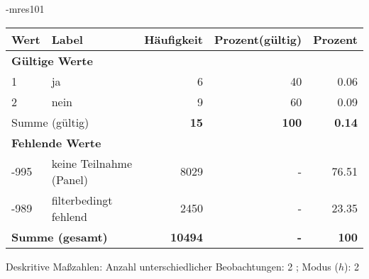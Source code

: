                 \vspace*{-\baselineskip}
					\begin{filecontents}{\jobname-mres101}
					\begin{longtable}{lXrrr}
					\toprule
					\textbf{Wert} & \textbf{Label} & \textbf{Häufigkeit} & \textbf{Prozent(gültig)} & \textbf{Prozent} \\
					\endhead
					\midrule
					\multicolumn{5}{l}{\textbf{Gültige Werte}}\\

					1 &
					\multicolumn{1}{X}{ ja   } &


					  \num{6} &
					  \num[round-mode=places,round-precision=2]{40} &
					    \num[round-mode=places,round-precision=2]{0,06} \\

					2 &
					\multicolumn{1}{X}{ nein   } &


					  \num{9} &
					  \num[round-mode=places,round-precision=2]{60} &
					    \num[round-mode=places,round-precision=2]{0,09} \\
					\midrule
					\multicolumn{2}{l}{Summe (gültig)} &
					  \textbf{\num{15}} &
					\textbf{100} &
					  \textbf{\num[round-mode=places,round-precision=2]{0,14}} \\
					\multicolumn{5}{l}{\textbf{Fehlende Werte}}\\
							-995 &
							keine Teilnahme (Panel) &
							  \num{8029} &
							 - &
							  \num[round-mode=places,round-precision=2]{76,51} \\
							-989 &
							filterbedingt fehlend &
							  \num{2450} &
							 - &
							  \num[round-mode=places,round-precision=2]{23,35} \\
					\midrule
					\multicolumn{2}{l}{\textbf{Summe (gesamt)}} &
				      \textbf{\num{10494}} &
				    \textbf{-} &
				    \textbf{100} \\
					\bottomrule
					\end{longtable}
					\end{filecontents}
				\label{tableValues:mres101}
				\vspace*{-\baselineskip}
                    \begin{noten}
                	    \note{} Deskritive Maßzahlen:
                	    Anzahl unterschiedlicher Beobachtungen: 2%
                	    ; 
                	      Modus ($h$): 2
                     \end{noten}


